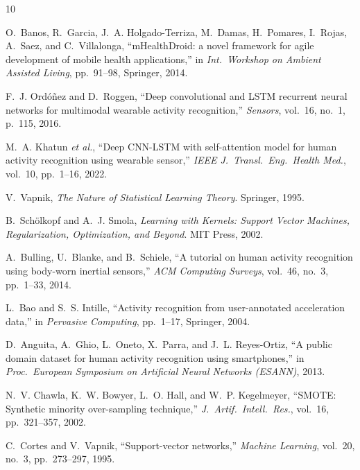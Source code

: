 \documentclass[10pt,twocolumn,letterpaper]{article}
\begin{document}
{\small

\begin{thebibliography}{10}

O.~Banos, R.~Garcia, J.~A. Holgado-Terriza, M.~Damas, H.~Pomares, I.~Rojas, A.~Saez, and C.~Villalonga,
``mHealthDroid: a novel framework for agile development of mobile health applications,''
in \textit{Int.\ Workshop on Ambient Assisted Living}, pp.~91--98, Springer, 2014.

F.~J. Ord{\'o}{\~n}ez and D.~Roggen,
``Deep convolutional and LSTM recurrent neural networks for multimodal wearable activity recognition,''
\textit{Sensors}, vol.~16, no.~1, p.~115, 2016.

M.~A. Khatun \textit{et al.},
``Deep CNN-LSTM with self-attention model for human activity recognition using wearable sensor,''
\textit{IEEE J.\ Transl.\ Eng.\ Health Med.}, vol.~10, pp.~1--16, 2022.

V.~Vapnik,
\textit{The Nature of Statistical Learning Theory}.
Springer, 1995.

B.~Sch{\"o}lkopf and A.~J. Smola,
\textit{Learning with Kernels: Support Vector Machines, Regularization, Optimization, and Beyond}.
MIT Press, 2002.

A.~Bulling, U.~Blanke, and B.~Schiele,
``A tutorial on human activity recognition using body-worn inertial sensors,''
\textit{ACM Computing Surveys}, vol.~46, no.~3, pp.~1--33, 2014.

L.~Bao and S.~S. Intille,
``Activity recognition from user-annotated acceleration data,''
in \textit{Pervasive Computing}, pp.~1--17, Springer, 2004.

D.~Anguita, A.~Ghio, L.~Oneto, X.~Parra, and J.~L. Reyes-Ortiz,
``A public domain dataset for human activity recognition using smartphones,''
in \textit{Proc.\ European Symposium on Artificial Neural Networks (ESANN)}, 2013.

N.~V. Chawla, K.~W. Bowyer, L.~O. Hall, and W.~P. Kegelmeyer,
``SMOTE: Synthetic minority over-sampling technique,''
\textit{J.\ Artif.\ Intell.\ Res.}, vol.~16, pp.~321--357, 2002.

C.~Cortes and V.~Vapnik,
``Support-vector networks,''
\textit{Machine Learning}, vol.~20, no.~3, pp.~273--297, 1995.

\end{thebibliography}
}
\end{document}
